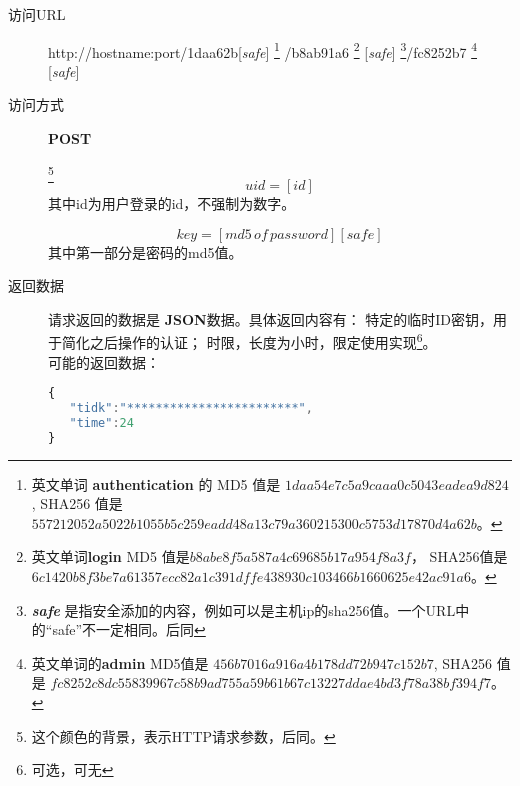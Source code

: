 \documentclass[UTF8]{article}
\def\safe{[\textit{safe}]}
\def\POST{\textbf{POST}}
\def\bfJSON{\textbf{JSON}}
\def\viaurl{\item[访问URL]}
\def\viareq#1{\item[访问方式] #1}
\def\rtdata{\item[返回数据]}
\begin{document}
    \begin{description}

        \viaurl http://hostname:port/1daa62b\safe
        \footnote{
            英文单词 \textbf{authentication} 的
            MD5 值是
            $1daa54e7c5a9caaa0c5043eadea9d824$,
            SHA256 值是
            $557212052a5022b1055b5c259eadd48a13c79a360215300c5753d17870d4a62b$。
        }
        /b8ab91a6
        \footnote{
            英文单词\textbf{login}  MD5 值是$b8abe8f5a587a4c69685b17a954f8a3f$，
            SHA256值是
            $6c1420b8f3be7a61357ecc82a1c391dffe438930c103466b1660625e42ac91a6$。
        }
        \safe
        \footnote{\textit{\textbf{safe}} 是指安全添加的内容，例如可以是主机ip的sha256值。一个URL中的“safe”不一定相同。后同}/fc8252b7
        \footnote{
            英文单词的\textbf{admin} 
            MD5值是 $456b7016a916a4b178dd72b947c152b7 $,
            SHA256 值是
            $fc8252c8dc55839967c58b9ad755a59b61b67c13227ddae4bd3f78a38bf394f7$。
        }
        \safe

        \viareq \POST

        \label{par:id}
        \footnote{这个颜色的背景，表示HTTP请求参数，后同。}
        $$uid=[id]$$
        其中id为用户登录的id，不强制为数字。

        \label{par:key}
         $$key=[md5\, of\, password][safe]$$
         其中第一部分是密码的md5值。

        \rtdata 请求返回的数据是 \bfJSON 数据。具体返回内容有：
        特定的临时ID密钥，用于简化之后操作的认证；
        时限，长度为小时，限定使用实现\footnote{可选，可无}。
         \\ 可能的返回数据：
        \begin{lstlisting}[language=JavaScript]
{
   "tidk":"************************",
   "time":24
}
        \end{lstlisting}


    \end{description}
\end{document}
